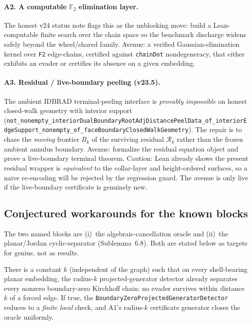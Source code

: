 \paragraph{A2. A computable $\mathbb{F}_2$ elimination layer.} The honest v24
status note flags this as the unblocking move: build a Lean-computable finite
search over the chain space so the benchmark discharge widens safely beyond the
wheel/shared family. Avenue: a verified Gaussian-elimination kernel over
\verb|F2| edge-chains, certified against \verb|chainDot| nondegeneracy, that
either exhibits an evader or certifies its absence on a given embedding.

\paragraph{A3. Residual / live-boundary peeling (v23.5).} The ambient IDBRAD
terminal-peeling interface is \emph{provably impossible} on honest closed-walk
geometry with interior support
(\verb|not_nonempty_interiorDualBoundaryRootAdjDistancePeelData_of_interiorEdgeSupport_nonempty_of_faceBoundaryClosedWalkGeometry|).
The repair is to chase the \emph{moving} frontier $B_k$ of the surviving
residual $\mathcal{R}_k$ rather than the frozen ambient annulus boundary. Avenue:
formalize the residual equation object and prove a live-boundary terminal
theorem. Caution: Lean already shows the present residual wrapper is
\emph{equivalent} to the collar-layer and height-ordered surfaces, so a naive
re-encoding will be rejected by the regression guard. The avenue is only live if
the live-boundary certificate is genuinely new.

\subsection{Conjectured workarounds for the known blocks}

The two named blocks are (i)~the algebraic-cancellation oracle and (ii)~the
planar/Jordan cyclic-separator (Sublemma~6.8). Both are stated below as targets
for genius, not as results.

\begin{conjecture}
\label{conj:4cp-local-detector}
There is a constant $k$ (independent of the graph) such that on every
shell-bearing planar embedding, the radius-$k$ projected-generator detector
already separates every nonzero boundary-zero Kirchhoff chain: no evader
survives within distance $k$ of a forced edge. If true, the
\verb|BoundaryZeroProjectedGeneratorDetector| reduces to a \emph{finite local}
check, and A1's radius-$k$ certificate generator closes the oracle uniformly.
\end{conjecture}

